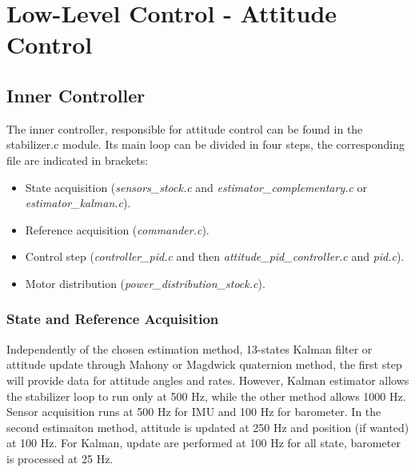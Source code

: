 \documentclass[a4paper, 12pt]{report}
\begin{document}
\newpage
\section{Low-Level Control - Attitude Control}
\subsection{Inner Controller}
\label{sec:innerControl}
The inner controller, responsible for attitude control can be found in the stabilizer.c module. Its main loop can be divided in four steps, the corresponding file are indicated in brackets:
\begin{itemize}
\item State acquisition (\emph{sensors\_stock.c} and \emph{estimator\_complementary.c}  or \emph{estimator\_kalman.c}).
\item Reference acquisition (\emph{commander.c}).
\item Control step (\emph{controller\_pid.c} and then \emph{attitude\_pid\_controller.c} and \emph{pid.c}).
\item Motor distribution (\emph{power\_distribution\_stock.c}).
\end{itemize}

\subsubsection{State and Reference Acquisition}
Independently of the chosen estimation method, 13-states Kalman filter or attitude update through Mahony or Magdwick quaternion method, the first step will provide data for attitude angles and rates. However, Kalman estimator allows the stabilizer loop to run only at 500 Hz, while the other method allows 1000 Hz. Sensor acquisition runs at 500 Hz for IMU and 100 Hz for barometer. In the second estimaiton method, attitude is updated at 250 Hz and position (if wanted) at 100 Hz. For Kalman, update are performed at 100 Hz for all state, barometer is processed at 25 Hz.
\end{document}

